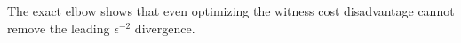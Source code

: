 The exact elbow shows that even optimizing the witness cost disadvantage cannot remove the leading \(\epsilon^{-2}\) divergence.